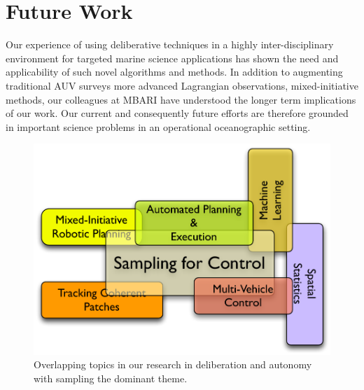 \section{Future Work}
\label{sec:future}

Our experience of using deliberative techniques in a highly
inter-disciplinary environment for targeted marine science
applications has shown the need and applicability of such novel
algorithms and methods. In addition to augmenting traditional AUV
surveys more advanced Lagrangian observations, mixed-initiative
methods, our colleagues at MBARI have understood the longer term
implications of our work. Our current and consequently future efforts
are therefore grounded in important science problems in an operational
oceanographic setting.

\begin{figure}[h]
  \centering
  \includegraphics[scale=0.45]{figs/autonomy-topics.pdf}
  \caption{\small Overlapping topics in our research in deliberation
    and autonomy with sampling the dominant theme.}
  \label{fig:topics}
\end{figure}

